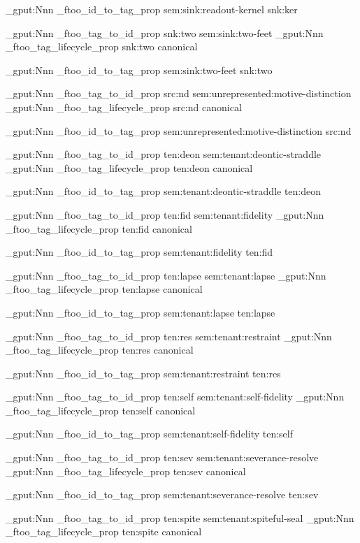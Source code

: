 \prop_gput:Nnn \g_ftoo_id_to_tag_prop { sem:sink:readout-kernel } { snk:ker }


\prop_gput:Nnn \g_ftoo_tag_to_id_prop { snk:two } { sem:sink:two-feet }
\prop_gput:Nnn \g_ftoo_tag_lifecycle_prop { snk:two } { canonical }

\prop_gput:Nnn \g_ftoo_id_to_tag_prop { sem:sink:two-feet } { snk:two }


\prop_gput:Nnn \g_ftoo_tag_to_id_prop { src:nd } { sem:unrepresented:motive-distinction }
\prop_gput:Nnn \g_ftoo_tag_lifecycle_prop { src:nd } { canonical }

\prop_gput:Nnn \g_ftoo_id_to_tag_prop { sem:unrepresented:motive-distinction } { src:nd }


\prop_gput:Nnn \g_ftoo_tag_to_id_prop { ten:deon } { sem:tenant:deontic-straddle }
\prop_gput:Nnn \g_ftoo_tag_lifecycle_prop { ten:deon } { canonical }

\prop_gput:Nnn \g_ftoo_id_to_tag_prop { sem:tenant:deontic-straddle } { ten:deon }


\prop_gput:Nnn \g_ftoo_tag_to_id_prop { ten:fid } { sem:tenant:fidelity }
\prop_gput:Nnn \g_ftoo_tag_lifecycle_prop { ten:fid } { canonical }

\prop_gput:Nnn \g_ftoo_id_to_tag_prop { sem:tenant:fidelity } { ten:fid }


\prop_gput:Nnn \g_ftoo_tag_to_id_prop { ten:lapse } { sem:tenant:lapse }
\prop_gput:Nnn \g_ftoo_tag_lifecycle_prop { ten:lapse } { canonical }

\prop_gput:Nnn \g_ftoo_id_to_tag_prop { sem:tenant:lapse } { ten:lapse }


\prop_gput:Nnn \g_ftoo_tag_to_id_prop { ten:res } { sem:tenant:restraint }
\prop_gput:Nnn \g_ftoo_tag_lifecycle_prop { ten:res } { canonical }

\prop_gput:Nnn \g_ftoo_id_to_tag_prop { sem:tenant:restraint } { ten:res }


\prop_gput:Nnn \g_ftoo_tag_to_id_prop { ten:self } { sem:tenant:self-fidelity }
\prop_gput:Nnn \g_ftoo_tag_lifecycle_prop { ten:self } { canonical }

\prop_gput:Nnn \g_ftoo_id_to_tag_prop { sem:tenant:self-fidelity } { ten:self }


\prop_gput:Nnn \g_ftoo_tag_to_id_prop { ten:sev } { sem:tenant:severance-resolve }
\prop_gput:Nnn \g_ftoo_tag_lifecycle_prop { ten:sev } { canonical }

\prop_gput:Nnn \g_ftoo_id_to_tag_prop { sem:tenant:severance-resolve } { ten:sev }


\prop_gput:Nnn \g_ftoo_tag_to_id_prop { ten:spite } { sem:tenant:spiteful-seal }
\prop_gput:Nnn \g_ftoo_tag_lifecycle_prop { ten:spite } { canonical }

